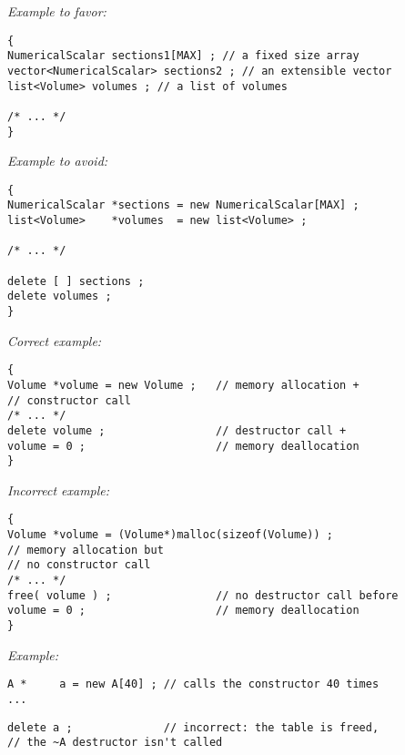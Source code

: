 \emph{Example to favor:}
\begin{lstlisting}[frame=TBRL]
{
NumericalScalar sections1[MAX] ; // a fixed size array
vector<NumericalScalar> sections2 ; // an extensible vector
list<Volume> volumes ; // a list of volumes

/* ... */
}
\end{lstlisting}
\emph{Example to avoid:}
\begin{lstlisting}[frame=TBRL]
{
NumericalScalar *sections = new NumericalScalar[MAX] ;
list<Volume>    *volumes  = new list<Volume> ;

/* ... */

delete [ ] sections ;
delete volumes ;
}
\end{lstlisting}

\emph{Correct example:}
\begin{lstlisting}[frame=TBRL]
{
Volume *volume = new Volume ;   // memory allocation +
// constructor call
/* ... */
delete volume ;                 // destructor call +
volume = 0 ;                    // memory deallocation
}
\end{lstlisting}
\emph{Incorrect example:}
\begin{lstlisting}[frame=TBRL]
{
Volume *volume = (Volume*)malloc(sizeof(Volume)) ;
// memory allocation but
// no constructor call
/* ... */
free( volume ) ;                // no destructor call before
volume = 0 ;                    // memory deallocation
}
\end{lstlisting}

\emph{Example:}
\lstset{language=C++, basicstyle=\normalsize}
\begin{lstlisting}[frame=TRL]
A *     a = new A[40] ; // calls the constructor 40 times
...
\end{lstlisting}
\begin{lstlisting}[frame=RL]
delete a ;              // incorrect: the table is freed,
// the ~A destructor isn't called
\end{lstlisting}

